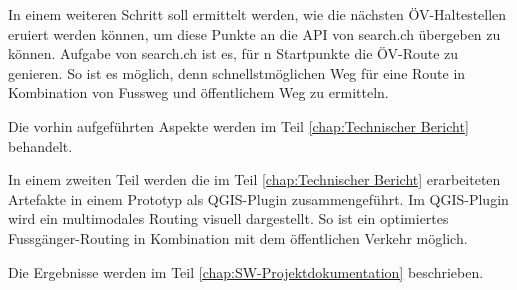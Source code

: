 In einem weiteren Schritt soll ermittelt werden, wie die nächsten ÖV-Haltestellen eruiert werden können, um diese Punkte an die API von search.ch \cite{search_ch_route_api} übergeben zu können. Aufgabe von search.ch ist es, für n Startpunkte die ÖV-Route zu genieren. So ist es möglich, denn schnellstmöglichen Weg für eine Route in Kombination von Fussweg und öffentlichem Weg zu ermitteln.

Die vorhin aufgeführten Aspekte werden im Teil \ref{chap:Technischer Bericht} behandelt.

In einem zweiten Teil werden die im Teil \ref{chap:Technischer Bericht} erarbeiteten Artefakte in einem Prototyp als QGIS-Plugin zusammengeführt. Im QGIS-Plugin wird ein multimodales Routing visuell dargestellt. So ist ein optimiertes Fussgänger-Routing in Kombination mit dem öffentlichen Verkehr möglich.

Die Ergebnisse werden im Teil \ref{chap:SW-Projektdokumentation} beschrieben.
